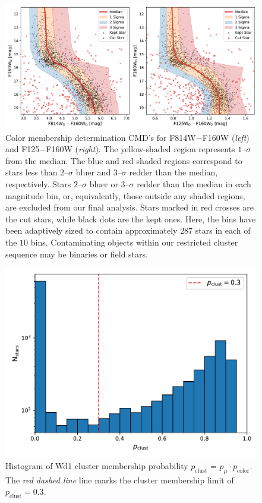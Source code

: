 \documentclass[12pt]{ucsddissertation}
\begin{document}
\begin{CJK*}{UTF8}{gbsn}
\begin{figure}[htb!]
\centering
\includegraphics[width = \linewidth]{figures/chapter2/color_plot_bsig_2_rsig_3_m_11_20_bmarked_False.pdf}
\caption[Color membership of Wd1]{Color membership determination CMD's for F814W$-$F160W (\emph{left}) and F125$-$F160W (\emph{right}). The yellow-shaded region represents $1$--$\sigma$ from the median. The blue and red shaded regions correspond to stars less than $2$--$\sigma$ bluer and $3$--$\sigma$ redder than the median, respectively. Stars $2$--$\sigma$ bluer or $3$--$\sigma$ redder than the median in each magnitude bin, or, equivalently, those outside any shaded regions, are excluded from our final analysis. Stars marked in red crosses are the cut stars, while black dots are the kept ones. Here, the bins have been adaptively sized to contain approximately $287$ stars in each of the $10$ bins. Contaminating objects within our restricted cluster sequence may be binaries or field stars.}
\label{fig:color_membership}
\end{figure}


\begin{figure}[htb!]
\centering 
\includegraphics[width = 0.7\linewidth]{figures/chapter2/membership_histogram.pdf}
\caption[Histogram of Wd1 cluster membership probability]{Histogram of Wd1 cluster membership probability $p_{\mathrm{clust}}$ = $p_\mu \cdot p_{\mathrm{color}}$. The {\em red dashed line} line marks the cluster membership limit of $p_\mathrm{clust} = 0.3$. }
\label{fig:mem_histogram}
\end{figure}



\end{CJK*}
\end{document}
